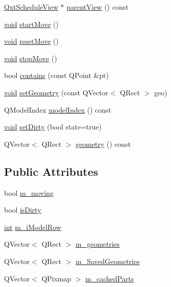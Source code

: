 \begin{DoxyCompactItemize}
\item 
\hyperlink{class_qxt_schedule_view}{Qxt\-Schedule\-View} $\ast$ \hyperlink{class_qxt_schedule_internal_item_a584d8b65ff4145c428d5e0774b69867f}{parent\-View} () const 
\item 
\hyperlink{group___u_a_v_objects_plugin_ga444cf2ff3f0ecbe028adce838d373f5c}{void} \hyperlink{class_qxt_schedule_internal_item_ac976b5d2de75e43770b4e0af5cc9ed32}{start\-Move} ()
\item 
\hyperlink{group___u_a_v_objects_plugin_ga444cf2ff3f0ecbe028adce838d373f5c}{void} \hyperlink{class_qxt_schedule_internal_item_a0667b155018ba5c0ed4068a2df1a706a}{reset\-Move} ()
\item 
\hyperlink{group___u_a_v_objects_plugin_ga444cf2ff3f0ecbe028adce838d373f5c}{void} \hyperlink{class_qxt_schedule_internal_item_a77f08deef84d18a531c4b270cef2e141}{stop\-Move} ()
\item 
bool \hyperlink{class_qxt_schedule_internal_item_aa958cb8f41acc6faf283dafe1c4ee384}{contains} (const Q\-Point \&pt)
\item 
\hyperlink{group___u_a_v_objects_plugin_ga444cf2ff3f0ecbe028adce838d373f5c}{void} \hyperlink{class_qxt_schedule_internal_item_a850f1298bcfad9715659c397858dfda0}{set\-Geometry} (const Q\-Vector$<$ Q\-Rect $>$ geo)
\item 
Q\-Model\-Index \hyperlink{class_qxt_schedule_internal_item_a3a7784bc29027b3e4511098263cbaef4}{model\-Index} () const 
\item 
\hyperlink{group___u_a_v_objects_plugin_ga444cf2ff3f0ecbe028adce838d373f5c}{void} \hyperlink{class_qxt_schedule_internal_item_a65fb8d09b2768ab98cccca39c62a7e9d}{set\-Dirty} (bool state=true)
\item 
Q\-Vector$<$ Q\-Rect $>$ \hyperlink{class_qxt_schedule_internal_item_aa10a452a267a98ae6d833333b1fa628b}{geometry} () const 
\end{DoxyCompactItemize}
\subsection*{Public Attributes}
\begin{DoxyCompactItemize}
\item 
bool \hyperlink{class_qxt_schedule_internal_item_ad4852ad984c7d5d81bd423abc9da4a6c}{m\-\_\-moving}
\item 
bool \hyperlink{class_qxt_schedule_internal_item_ab2e390f318eee95d7a0d5f9b87f4e723}{is\-Dirty}
\item 
\hyperlink{ioapi_8h_a787fa3cf048117ba7123753c1e74fcd6}{int} \hyperlink{class_qxt_schedule_internal_item_a793bd3bd5448bdb1f59bd3be1ac485f7}{m\-\_\-i\-Model\-Row}
\item 
Q\-Vector$<$ Q\-Rect $>$ \hyperlink{class_qxt_schedule_internal_item_a1ff46bc8425f7b145f5f8e256730d121}{m\-\_\-geometries}
\item 
Q\-Vector$<$ Q\-Rect $>$ \hyperlink{class_qxt_schedule_internal_item_adb0eab97c8cbc454ae13c106a13ca6b3}{m\-\_\-\-Saved\-Geometries}
\item 
Q\-Vector$<$ Q\-Pixmap $>$ \hyperlink{class_qxt_schedule_internal_item_aad1d02d5bdf69dd78fc652bdab7be174}{m\-\_\-cached\-Parts}
\end{DoxyCompactItemize}
